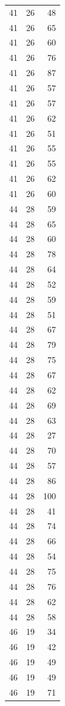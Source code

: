 \documentclass[
  letterpaper,
  DIV=11,
  numbers=noendperiod]{scrreprt}
\renewcommand{\[}{\begin{equation}}
\renewcommand{\]}{\end{equation}}
\begin{document}
\begin{table}
\begin{tabular*}{\linewidth}{@{\extracolsep{\fill}}rrr}
41 & 26 & 48 \\ 
41 & 26 & 65 \\ 
41 & 26 & 60 \\ 
41 & 26 & 76 \\ 
41 & 26 & 87 \\ 
41 & 26 & 57 \\ 
41 & 26 & 57 \\ 
41 & 26 & 62 \\ 
41 & 26 & 51 \\ 
41 & 26 & 55 \\ 
41 & 26 & 55 \\ 
41 & 26 & 62 \\ 
41 & 26 & 60 \\ 
44 & 28 & 59 \\ 
44 & 28 & 65 \\ 
44 & 28 & 60 \\ 
44 & 28 & 78 \\ 
44 & 28 & 64 \\ 
44 & 28 & 52 \\ 
44 & 28 & 59 \\ 
44 & 28 & 51 \\ 
44 & 28 & 67 \\ 
44 & 28 & 79 \\ 
44 & 28 & 75 \\ 
44 & 28 & 67 \\ 
44 & 28 & 62 \\ 
44 & 28 & 69 \\ 
44 & 28 & 63 \\ 
44 & 28 & 27 \\ 
44 & 28 & 70 \\ 
44 & 28 & 57 \\ 
44 & 28 & 86 \\ 
44 & 28 & 100 \\ 
44 & 28 & 41 \\ 
44 & 28 & 74 \\ 
44 & 28 & 66 \\ 
44 & 28 & 54 \\ 
44 & 28 & 75 \\ 
44 & 28 & 76 \\ 
44 & 28 & 62 \\ 
44 & 28 & 58 \\ 
46 & 19 & 34 \\ 
46 & 19 & 42 \\ 
46 & 19 & 49 \\ 
46 & 19 & 49 \\ 
46 & 19 & 71 \\ 

\end{tabular*}
\end{table}
\end{document}
